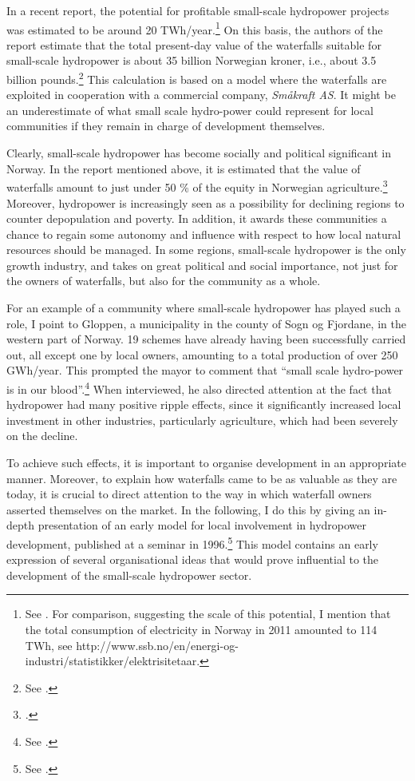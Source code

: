 In a recent report, the potential for profitable small-scale hydropower projects was estimated to be around 20 TWh/year.\footnote{See \cite{aanesland09}. For comparison, suggesting the scale of this potential, I mention that the total consumption of electricity in Norway in 2011 amounted to 114 TWh, see http://www.ssb.no/en/energi-og-industri/statistikker/elektrisitetaar.} On this basis, the authors of the report estimate that the total present-day value of the waterfalls suitable for small-scale hydropower is about 35 billion Norwegian kroner, i.e., about 3.5 billion pounds.\footnote{See \cite[1]{aanesland09}.} This calculation is based on a model where the waterfalls are exploited in cooperation with a commercial company, {\it Småkraft AS}. It might be an underestimate of what small scale hydro-power could represent for local communities if they remain in charge of development themselves.

Clearly, small-scale hydropower has become socially and political significant in Norway. In the report mentioned above, it is estimated that the value of waterfalls amount to just under 50 \% of the equity in Norwegian agriculture.\footcite[1]{aanesland09} Moreover, hydropower is increasingly seen as a possibility for declining regions to counter depopulation and poverty. In addition, it awards these communities a chance to regain some autonomy and influence with respect to how local natural resources should be managed. In some regions, small-scale hydropower is the only growth industry, and takes on great political and social importance, not just for the owners of waterfalls, but also for the community as a whole.

For an example of a community where small-scale hydropower has played such a role, I point to Gloppen, a municipality in the county of Sogn og Fjordane, in the western part of Norway. 19 schemes have already having been successfully carried out, all except one by local owners, amounting to a total production of over 250 GWh/year. This prompted the mayor to comment that ``small scale hydro-power is in our blood''.\footnote{See \cite{starheim12}.} When interviewed, he also directed attention at the fact that hydropower had many positive ripple effects, since it significantly increased local investment in other industries, particularly agriculture, which had been severely on the decline.

To achieve such effects, it is important to organise development in an appropriate manner. Moreover, to explain how waterfalls came to be as valuable as they are today, it is crucial to direct attention to the way in which waterfall owners asserted themselves on the market. In the following, I do this by giving an in-depth presentation of an early model for local involvement in hydropower development, published at a seminar in 1996.\footnote{See \cite{dyrkolbotn96}.} This model contains an early expression of several organisational ideas that would prove influential to the development of the small-scale hydropower sector.

